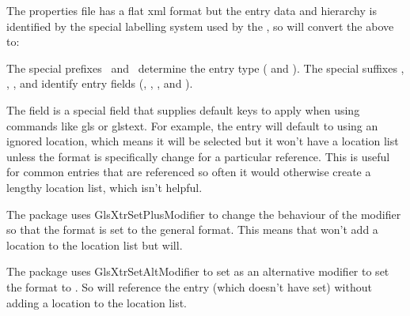 \documentclass[toc=listof]{scrreport}
\begin{document}
The properties file has a flat \gls{xml} format but the entry data
and hierarchy is identified by the special labelling system used by
the , so  will convert the above to:
\begin{codebox}
\codepar
{}
\codepar
{} 
\end{codebox}
The special prefixes \ and \ determine the
entry type ( and ). The special
suffixes , , ,
 and  identify entry fields (,
, ,
 and ).

The  field is a special field that
supplies default keys to apply when using commands like \gls{gls} or
\gls{glstext}. For example, the  entry will default
to using an ignored location, which means it will be selected but 
it won't have a location list unless the format is specifically
change for a particular reference. This is useful for common entries
that are referenced so often it would otherwise create a lengthy
location list, which isn't helpful.

The  package uses \gls{GlsXtrSetPlusModifier}
to change the behaviour of the \code{+} modifier so that the format
is set to the general  format.
This means that  won't add a
location to the location list but
 will.

The  package uses \gls{GlsXtrSetAltModifier} to set
\code{!} as an alternative modifier to set the format to
. So  will
reference the  entry (which doesn't have
 set) without adding a location to the
location list.
\end{document}
